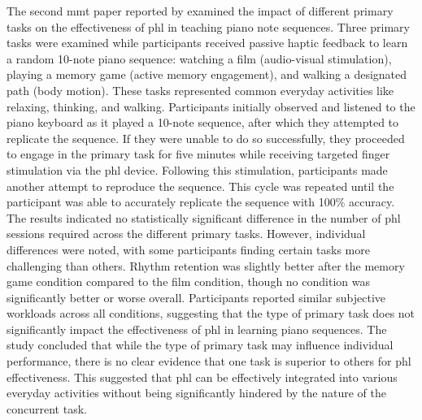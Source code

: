 The second \gls{mmt} paper reported by \cite{Kohlsdorf2010} examined the impact of different primary tasks on the effectiveness of \gls{phl} in teaching piano note sequences. Three primary tasks were examined while participants received passive haptic feedback to learn a random 10-note piano sequence: watching a film (audio-visual stimulation), playing a memory game (active memory engagement), and walking a designated path (body motion). These tasks represented common everyday activities like relaxing, thinking, and walking. Participants initially observed and listened to the piano keyboard as it played a 10-note sequence, after which they attempted to replicate the sequence. If they were unable to do so successfully, they proceeded to engage in the primary task for five minutes while receiving targeted finger stimulation via the \gls{phl} device. Following this stimulation, participants made another attempt to reproduce the sequence. This cycle was repeated until the participant was able to accurately replicate the sequence with 100\% accuracy. The results indicated no statistically significant difference in the number of \gls{phl} sessions required across the different primary tasks. However, individual differences were noted, with some participants finding certain tasks more challenging than others. Rhythm retention was slightly better after the memory game condition compared to the film condition, though no condition was significantly better or worse overall. Participants reported similar subjective workloads across all conditions, suggesting that the type of primary task does not significantly impact the effectiveness of \gls{phl} in learning piano sequences. The study concluded that while the type of primary task may influence individual performance, there is no clear evidence that one task is superior to others for \gls{phl} effectiveness. This suggested that \gls{phl} can be effectively integrated into various everyday activities without being significantly hindered by the nature of the concurrent task.

